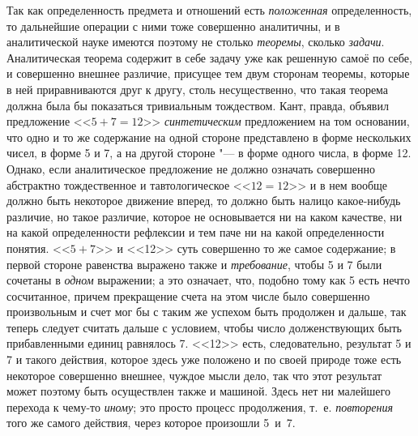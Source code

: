 Так как определенность предмета и отношений есть {\em положенная}
определенность, то дальнейшие операции с ними тоже совершенно
аналитичны, и в аналитической науке имеются поэтому не столько
{\em теоремы}, сколько {\em задачи}.
Аналитическая теорема содержит в себе задачу уже как решенную
самоё по себе, и совершенно внешнее различие, присущее тем двум сторонам
теоремы, которые в ней приравниваются друг к другу, столь несущественно,
что такая теорема должна была бы показаться тривиальным тождеством. Кант,
правда, объявил предложение <<$5+7=12$>> {\em синтетическим}
предложением на том основании, что одно и то же содержание на
одной стороне представлено в форме нескольких чисел, в форме 5 и 7, а на
другой стороне "--- в форме одного числа, в форме
12.
Однако, если аналитическое предложение не
должно означать совершенно абстрактно тождественное и тавтологическое
<<$12=12$>> и в нем вообще должно быть некоторое движение вперед, то должно
быть налицо какое-нибудь различие, но такое различие, которое не
основывается ни на каком качестве, ни на какой определенности рефлексии и
тем паче ни на какой определенности понятия. <<$5+7$>> и <<12>> суть совершенно
то же самое содержание; в первой стороне равенства выражено также и
{\em требование}, чтобы 5 и 7 были сочетаны в {\em одном}
выражении; а это означает, что, подобно тому как 5 есть нечто
сосчитанное, причем прекращение счета на этом числе было совершенно
произвольным и счет мог бы с таким же успехом быть продолжен и дальше, так
теперь следует считать дальше с условием, чтобы число долженствующих быть
прибавленными единиц равнялось 7. <<12>> есть, следовательно, результат 5 и 7
и такого действия, которое здесь уже положено и по своей природе тоже есть
некоторое совершенно внешнее, чуждое мысли дело, так что этот результат
может поэтому быть осуществлен также и машиной. Здесь нет ни малейшего
перехода к чему-то {\em иному};
это просто процесс продолжения, т.~е.
{\em повторения} того же
самого действия, через которое произошли 5~и~7.

